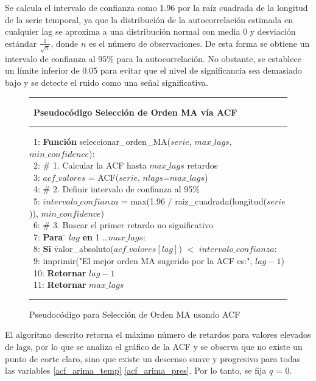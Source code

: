 Se calcula el intervalo de confianza como 1.96 por la raíz cuadrada de la longitud de la serie temporal, ya que la distribución de
la autocorrelación estimada en cualquier lag se aproxima a una distribución normal con media 0 y desviación estándar $\frac{1}{\sqrt{n}}$,
donde $n$ es el número de observaciones. De esta forma se obtiene un intervalo de confianza al 95\% para la autocorrelación. No obstante, se establece 
un límite inferior de 0.05 para evitar que el nivel de significancia sea demasiado bajo y se detecte el ruido como una señal significativa.
\begin{figure}[H]
    {\small
    \hrule \
    {\bf\small Pseudocódigo Selección de Orden MA vía ACF}
    \hrule
    \begin{center}
    \begin{tabbing}
    \ 1: {\bf Fun}\={\bf ción} seleccionar\_orden\_MA($serie$, $max\_lags$, $min\_confidence$): \\
    \ 2: \> \# 1. Calcular la ACF hasta $max\_lags$ retardos \\
    \ 3: \> $acf\_valores$ = ACF($serie$, $nlags$=$max\_lags$) \\
    \ 4: \> \# 2. Definir intervalo de confianza al 95\% \\
    \ 5: \> $intervalo\_confianza$ = max(1.96 / raiz\_cuadrada(longitud($serie$)), $min\_confidence$) \\
    \ 6: \> \# 3. Buscar el primer retardo no significativo \\
    \ 7: \> {\bf Para} \= $lag$ {\bf en} 1 \dots $max\_lags$: \\
    \ 8: \> \> {\bf Si} \= valor\_absoluto($acf\_valores[lag]$) $<$ $intervalo\_confianza$: \\
    \ 9: \> \> \> imprimir("El mejor orden MA sugerido por la ACF es:", $lag-1$)\\
    \ 10: \> \> {\bf Retornar} $lag-1$\\
    \ 11: \> {\bf Retornar} $max\_lags$\\
    \end{tabbing}
    \end{center}
    }
    \hrule
    \caption{Pseudocódigo para Selección de Orden MA usando ACF}
    \label{acf_ma_order}
\end{figure}

El algoritmo descrito retorna el máximo número de retardos para valores elevados de lags, por lo que se analiza el gráfico de la ACF y se observa que
no existe un punto de corte claro, sino que existe un descenso suave y progresivo para todas las variables \ref{acf_arima_temp} \ref{acf_arima_pres}. Por lo tanto, se fija $q$ = 0.

